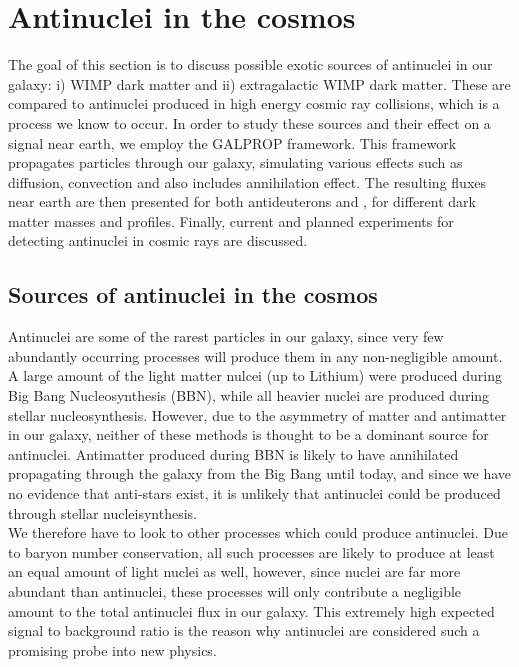 \section{Antinuclei in the cosmos}
The goal of this section is to discuss possible exotic sources of antinuclei in our galaxy: i) WIMP dark matter and ii) extragalactic WIMP dark matter. These are compared to antinuclei produced in high energy cosmic ray collisions, which is a process we know to occur. In order to study these sources and their effect on a signal near earth, we employ the GALPROP framework. This framework propagates particles through our galaxy, simulating various effects such as diffusion, convection and also includes annihilation effect. The resulting fluxes near earth are then presented for both antideuterons and \ahe, for different dark matter masses and profiles. Finally, current and planned experiments for detecting antinuclei in cosmic rays are discussed. 
\subsection{Sources of antinuclei in the cosmos}
Antinuclei are some of the rarest particles in our galaxy, since very few abundantly occurring processes will produce them in any non-negligible amount\cite{}. A large amount of the light matter nulcei (up to Lithium) were produced during Big Bang Nucleosynthesis (BBN)\cite{}, while all heavier nuclei are produced during stellar nucleosynthesis\cite{}. However, due to the asymmetry of matter and antimatter in our galaxy, neither of these methods is thought to be a dominant source for antinuclei. Antimatter produced during BBN is likely to have annihilated propagating through the galaxy from the Big Bang until today, and since we have no evidence that anti-stars exist\cite{}, it is unlikely that antinuclei could be produced through stellar nucleisynthesis. \\
We therefore have to look to other processes which could produce antinuclei. Due to baryon number conservation, all such processes are likely to produce at least an equal amount of light nuclei as well, however, since nuclei are far more abundant than antinuclei, these processes will only contribute a negligible amount to the total antinuclei flux in our galaxy. This extremely high expected signal to background ratio is the reason why antinuclei are considered such a promising probe into new physics.


